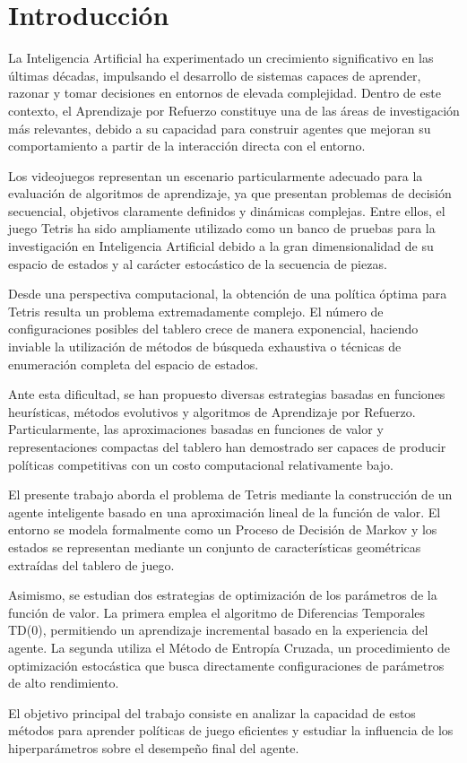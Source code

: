 \section{Introducción}

La Inteligencia Artificial ha experimentado un crecimiento significativo en las últimas décadas, impulsando el desarrollo de sistemas capaces de aprender, razonar y tomar decisiones en entornos de elevada complejidad. Dentro de este contexto, el Aprendizaje por Refuerzo constituye una de las áreas de investigación más relevantes, debido a su capacidad para construir agentes que mejoran su comportamiento a partir de la interacción directa con el entorno.

Los videojuegos representan un escenario particularmente adecuado para la evaluación de algoritmos de aprendizaje, ya que presentan problemas de decisión secuencial, objetivos claramente definidos y dinámicas complejas. Entre ellos, el juego Tetris ha sido ampliamente utilizado como un banco de pruebas para la investigación en Inteligencia Artificial debido a la gran dimensionalidad de su espacio de estados y al carácter estocástico de la secuencia de piezas.

Desde una perspectiva computacional, la obtención de una política óptima para Tetris resulta un problema extremadamente complejo. El número de configuraciones posibles del tablero crece de manera exponencial, haciendo inviable la utilización de métodos de búsqueda exhaustiva o técnicas de enumeración completa del espacio de estados.

Ante esta dificultad, se han propuesto diversas estrategias basadas en funciones heurísticas, métodos evolutivos y algoritmos de Aprendizaje por Refuerzo. Particularmente, las aproximaciones basadas en funciones de valor y representaciones compactas del tablero han demostrado ser capaces de producir políticas competitivas con un costo computacional relativamente bajo.

El presente trabajo aborda el problema de Tetris mediante la construcción de un agente inteligente basado en una aproximación lineal de la función de valor. El entorno se modela formalmente como un Proceso de Decisión de Markov y los estados se representan mediante un conjunto de características geométricas extraídas del tablero de juego.

Asimismo, se estudian dos estrategias de optimización de los parámetros de la función de valor. La primera emplea el algoritmo de Diferencias Temporales TD(0), permitiendo un aprendizaje incremental basado en la experiencia del agente. La segunda utiliza el Método de Entropía Cruzada, un procedimiento de optimización estocástica que busca directamente configuraciones de parámetros de alto rendimiento.

El objetivo principal del trabajo consiste en analizar la capacidad de estos métodos para aprender políticas de juego eficientes y estudiar la influencia de los hiperparámetros sobre el desempeño final del agente.